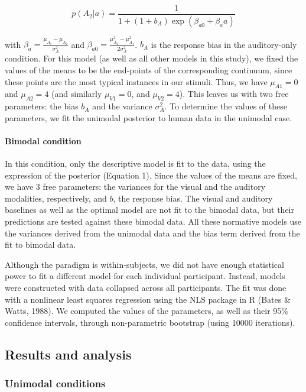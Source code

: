 \documentclass[english,,man,floatsintext]{apa6}
\let\oldparagraph\paragraph
\renewcommand{\paragraph}[1]{\oldparagraph{#1}\mbox{}}
\theoremstyle{definition}
\theoremstyle{definition}
\theoremstyle{definition}
\theoremstyle{remark}
\begin{document}
\[p(A_2 | a)=\frac{1}{1+(1+b_A)\exp(\beta_{a0}+\beta_aa)}\]

with \(\beta_a=\frac{\mu_{A_1}-\mu_{A_2}}{\sigma^2_{A}}\) and
\(\beta_{a0}=\frac{\mu^2_{A_2}-\mu^2_{A_1}}{2\sigma^2_{A}}\). \(b_A\) is
the response bias in the auditory-only condition. For this model (as
well as all other models in this study), we fixed the values of the
means to be the end-points of the corresponding continuum, since these
points are the most typical instances in our stimuli. Thus, we have
\(\mu_{A1}=0\) and \(\mu_{A2}=4\) (and similarly \(\mu_{V1}=0\), and
\(\mu_{V2}=4\)). This leaves us with two free parameters: the bias
\(b_A\) and the variance \(\sigma^2_{A}\). To determine the values of
these parameters, we fit the unimodal posterior to human data in the
unimodal case.

\paragraph{Bimodal condition}\label{bimodal-condition}

In this condition, only the descriptive model is fit to the data, using
the expression of the posterior (Equation 1). Since the values of the
means are fixed, we have 3 free parameters: the variances for the visual
and the auditory modalities, respectively, and \(b\), the response bias.
The visual and auditory baselines as well as the optimal model are not
fit to the bimodal data, but their predictions are tested against these
bimodal data. All these normative models use the variances derived from
the unimodal data and the bias term derived from the fit to bimodal
data.

Although the paradigm is within-subjects, we did not have enough
statistical power to fit a different model for each individual
participant. Instead, models were constructed with data collapsed across
all participants. The fit was done with a nonlinear least squares
regression using the NLS package in R (Bates \& Watts, 1988). We
computed the values of the parameters, as well as their 95\% confidence
intervals, through non-parametric bootstrap (using 10000 iterations).

\subsection{Results and analysis}\label{results-and-analysis}

\subsubsection{Unimodal conditions}\label{unimodal-conditions-1}
\end{document}
